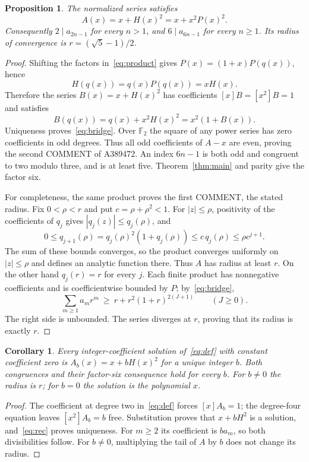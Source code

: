 \documentclass[11pt]{article}
\newtheorem{proposition}[theorem]{Proposition}
\newtheorem{corollary}[theorem]{Corollary}
\begin{document}
\begin{proposition}\label{prop:product}
The normalized series satisfies
\begin{equation}\label{eq:bridge}
 A(x)=x+H(x)^2=x+x^2P(x)^2.
\end{equation}
Consequently $2\mid a_{2n-1}$ for every $n>1$, and
$6\mid a_{6n-1}$ for every $n\ge1$.
Its radius of convergence is $r=(\sqrt5-1)/2$.
\end{proposition}
\begin{proof}
Shifting the factors in~\eqref{eq:product} gives
$P(x)=(1+x)P(q(x))$, hence
\[
 H(q(x))=q(x)P(q(x))=xH(x).
\]
Therefore the series $B(x)=x+H(x)^2$ has coefficients
$[x]B=[x^2]B=1$ and satisfies
\[
 B(q(x))=q(x)+x^2H(x)^2=x^2(1+B(x)).
\]
Uniqueness proves~\eqref{eq:bridge}. Over $\mathbb F_2$ the square
of any power series has zero coefficients in odd degrees. Thus all odd
coefficients of $A-x$ are even, proving the second COMMENT of A389472.
An index $6n-1$ is both odd and congruent to two modulo three, and is at
least five. Theorem~\ref{thm:main} and parity give the factor six.

For completeness, the same product proves the first COMMENT, the stated
radius. Fix $0<\rho<r$ and put $c=\rho+\rho^2<1$.
For $|z|\le\rho$, positivity of the coefficients of $q_j$ gives
$|q_j(z)|\le q_j(\rho)$, and
\[
 0\le q_{j+1}(\rho)
   =q_j(\rho)^2(1+q_j(\rho))
   \le c\,q_j(\rho)\le\rho c^{j+1}.
\]
The sum of these bounds converges, so the product converges uniformly
on $|z|\le\rho$ and defines an analytic function there.
Thus $A$ has radius at least $r$. On the other hand $q_j(r)=r$ for
every $j$. Each finite product has nonnegative coefficients and is
coefficientwise bounded by $P$; by~\eqref{eq:bridge},
\[
 \sum_{m\ge1}a_mr^m
 \ \ge\ r+r^2(1+r)^{2(J+1)}\qquad(J\ge0).
\]
The right side is unbounded. The series diverges at $r$, proving that
its radius is exactly $r$.
\end{proof}

\begin{corollary}\label{cor:normalization}
Every integer-coefficient solution of~\eqref{eq:def} with constant
coefficient zero is $A_b(x)=x+bH(x)^2$ for a unique integer $b$.
Both congruences and their factor-six consequence hold for every $b$.
For $b\ne0$ the radius is $r$; for $b=0$ the solution is the polynomial $x$.
\end{corollary}
\begin{proof}
The coefficient at degree two in~\eqref{eq:def} forces $[x]A_b=1$;
the degree-four equation leaves $[x^2]A_b=b$ free. Substitution proves
that $x+bH^2$ is a solution, and~\eqref{eq:rec} proves uniqueness.
For $m\ge2$ its coefficient is $b a_m$, so both divisibilities follow.
For $b\ne0$, multiplying the tail of $A$ by $b$ does not change its radius.
\end{proof}
\end{document}
